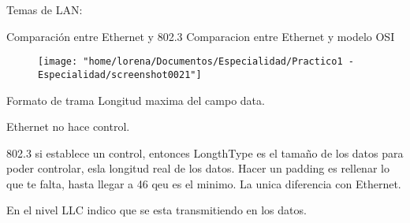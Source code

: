 Temas de LAN:

Comparación entre Ethernet y 802.3
Comparacion entre Ethernet y modelo OSI
\begin{figure}[h]
	\centering
	\texttt{[image: "home/lorena/Documentos/Especialidad/Practico1 - Especialidad/screenshot0021"]}
	\caption{}
	\label{fig:screenshot0021}
\end{figure}

Formato de trama
Longitud maxima del campo data.

Ethernet no hace control.

802.3 si establece un control, entonces LongthType es el tamaño de los datos para poder controlar, esla longitud real de los datos. Hacer un padding es rellenar lo que te falta, hasta llegar a 46 qeu es el minimo. La unica diferencia con Ethernet.

En el nivel LLC indico que se esta transmitiendo en los datos.